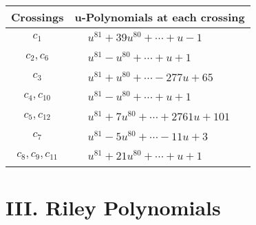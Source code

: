 \documentclass[1p]{elsarticle_modified}
\theoremstyle{definition}
\begin{document}
\begin{tabular}{m{50pt}|m{274pt}}
Crossings & \hspace{64pt}u-Polynomials at each crossing \\
\hline $$\begin{aligned}c_{1}\end{aligned}$$&$\begin{aligned}
&u^{81}+39 u^{80}+\cdots+u-1
\end{aligned}$\\
\hline $$\begin{aligned}c_{2},c_{6}\end{aligned}$$&$\begin{aligned}
&u^{81}- u^{80}+\cdots+u+1
\end{aligned}$\\
\hline $$\begin{aligned}c_{3}\end{aligned}$$&$\begin{aligned}
&u^{81}+u^{80}+\cdots-277 u+65
\end{aligned}$\\
\hline $$\begin{aligned}c_{4},c_{10}\end{aligned}$$&$\begin{aligned}
&u^{81}- u^{80}+\cdots+u+1
\end{aligned}$\\
\hline $$\begin{aligned}c_{5},c_{12}\end{aligned}$$&$\begin{aligned}
&u^{81}+7 u^{80}+\cdots+2761 u+101
\end{aligned}$\\
\hline $$\begin{aligned}c_{7}\end{aligned}$$&$\begin{aligned}
&u^{81}-5 u^{80}+\cdots-11 u+3
\end{aligned}$\\
\hline $$\begin{aligned}c_{8},c_{9},c_{11}\end{aligned}$$&$\begin{aligned}
&u^{81}+21 u^{80}+\cdots+u+1
\end{aligned}$\\
\hline
\end{tabular}\newpage\renewcommand{\arraystretch}{1}
\centering \section*{ III. Riley Polynomials}
\end{document}
